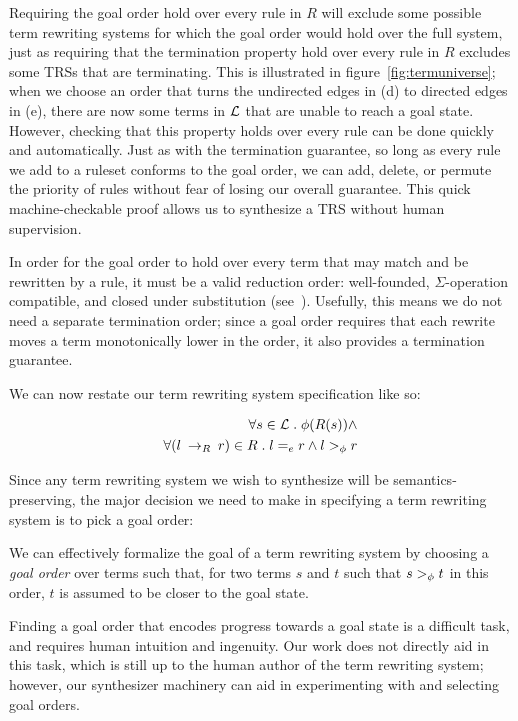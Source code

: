 Requiring the goal order hold over every rule in $R$ will exclude some possible term rewriting systems for which the goal order would hold over the full system, just as requiring that the termination property hold over every rule in $R$ excludes some TRSs that are terminating. This is illustrated in figure~\ref{fig:termuniverse}; when we choose an order that turns the undirected edges in (d) to directed edges in (e), there are now some terms in $\mathcal{L}$ that are unable to reach a goal state. However, checking that this property holds over every rule can be done quickly and automatically. Just as with the termination guarantee, so long as every rule we add to a ruleset conforms to the goal order, we can add, delete, or permute the priority of rules without fear of losing our overall guarantee. This quick machine-checkable proof allows us to synthesize a TRS without human supervision.

In order for the goal order to hold over every term that may match and be rewritten by a rule, it must be a valid reduction order: well-founded, $\Sigma$-operation compatible, and closed under substitution (see~\citep{baader1999term}). Usefully, this means we do not need a separate termination order; since a goal order requires that each rewrite moves a term monotonically lower in the order, it also provides a termination guarantee.

We can now restate our term rewriting system specification like so:

\begin{align*}
    \forall s \in \mathcal{L} \;.\; \phi(R(s)) \wedge \\
    \forall (l \:\rightarrow_{R}\: r) \in R \;.\; l =_e r \wedge l >_{\phi} r
\end{align*}

Since any term rewriting system we wish to synthesize will be semantics-preserving, the major decision we need to make in specifying a term rewriting system is to pick a goal order:

\begin{assumption}
We can effectively formalize the goal of a term rewriting system by choosing a \emph{goal order} over terms such that, for two terms $s$ and $t$ such that $s >_{\phi} t$ in this order, $t$ is assumed to be closer to the goal state.
\end{assumption}

Finding a goal order that encodes progress towards a goal state is a difficult task, and requires human intuition and ingenuity. Our work does not directly aid in this task, which is still up to the human author of the term rewriting system; however, our synthesizer machinery can aid in experimenting with and selecting goal orders.

